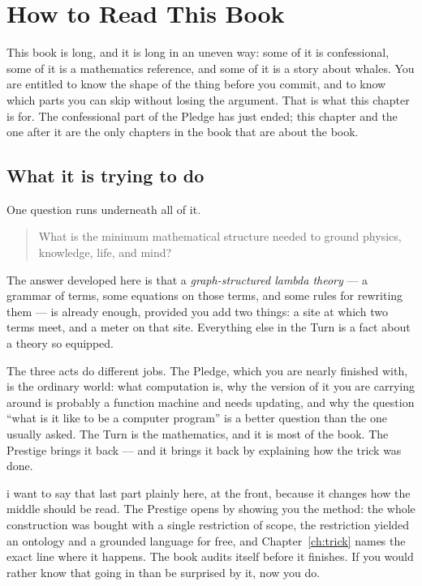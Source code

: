 \chapter*{How to Read This Book}
\label{ch:map}
\renewcommand{\thefigure}{\Alph{figure}}\setcounter{figure}{0}

This book is long, and it is long in an uneven way: some of it is
confessional, some of it is a mathematics reference, and some of it
is a story about whales.
You are entitled to know the shape of the thing before you commit,
and to know which parts you can skip without losing the argument.
That is what this chapter is for.
The confessional part of the Pledge has just ended; this chapter and
the one after it are the only chapters in the book that are about the
book.

\section*{What it is trying to do}

One question runs underneath all of it.

\begin{quote}
What is the minimum mathematical structure needed to ground
physics, knowledge, life, and mind?
\end{quote}

\noindent
The answer developed here is that a \emph{graph-structured lambda
theory} --- a grammar of terms, some equations on those terms, and
some rules for rewriting them --- is already enough, provided you
add two things: a site at which two terms meet, and a meter on that
site.
Everything else in the Turn is a fact about a theory so equipped.

The three acts do different jobs.
The Pledge, which you are nearly finished with, is the ordinary
world: what computation is, why the version of it you are carrying
around is probably a function machine and needs updating, and why
the question ``what is it like to be a computer program'' is a
better question than the one usually asked.
The Turn is the mathematics, and it is most of the book.
The Prestige brings it back --- and it brings it back by explaining
how the trick was done.

i want to say that last part plainly here, at the front, because it
changes how the middle should be read.
The Prestige opens by showing you the method: the whole
construction was bought with a single restriction of scope, the
restriction yielded an ontology and a grounded language for free,
and Chapter~\ref{ch:trick} names the exact line where it happens.
The book audits itself before it finishes.
If you would rather know that going in than be surprised by it,
now you do.

